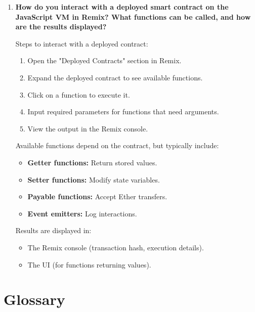 \documentclass[11pt]{article}
\begin{document}
\begin{enumerate}
    \item \textbf{How do you interact with a deployed smart contract on the JavaScript VM in Remix? What functions can be called, and how are the results displayed?}
    
    Steps to interact with a deployed contract:
    \begin{enumerate}
        \item Open the "Deployed Contracts" section in Remix.
        \item Expand the deployed contract to see available functions.
        \item Click on a function to execute it.
        \item Input required parameters for functions that need arguments.
        \item View the output in the Remix console.
    \end{enumerate}
    
    Available functions depend on the contract, but typically include:
    \begin{itemize}
        \item \textbf{Getter functions:} Return stored values.
        \item \textbf{Setter functions:} Modify state variables.
        \item \textbf{Payable functions:} Accept Ether transfers.
        \item \textbf{Event emitters:} Log interactions.
    \end{itemize}
    
    Results are displayed in:
    \begin{itemize}
        \item The Remix console (transaction hash, execution details).
        \item The UI (for functions returning values).
    \end{itemize}

\end{enumerate}

\section{Glossary}
\end{document}
